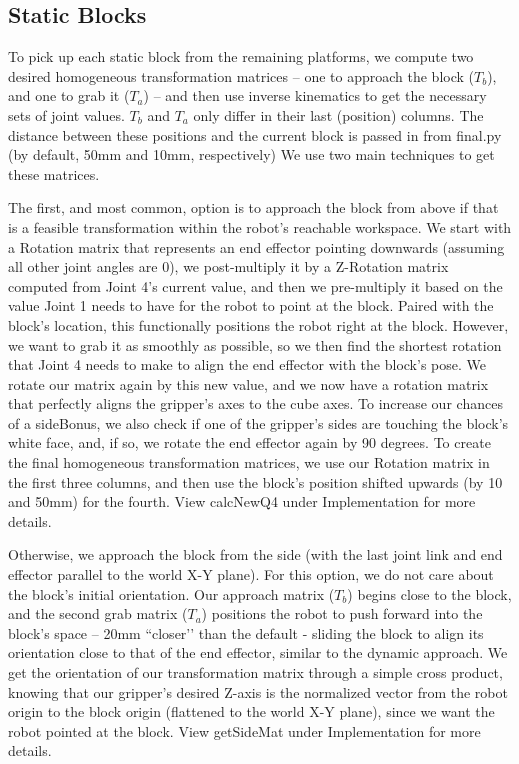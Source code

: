 \documentclass{article}
\begin{document}
    \subsection{Static Blocks}
    To pick up each static block from the remaining platforms, we compute two desired homogeneous transformation matrices – one to approach the block ($T_b$), and one to grab it ($T_a$) – and then use inverse kinematics to get the necessary sets of joint values. $T_b$ and $T_a$ only differ in their last (position) columns. The distance between these positions and the current block is passed in from final.py (by default, 50mm and 10mm, respectively) We use two main techniques to get these matrices. 
    
    The first, and most common, option is to approach the block from above if that is a feasible transformation within the robot’s reachable workspace. We start with a Rotation matrix that represents an end effector pointing downwards (assuming all other joint angles are 0), we post-multiply it by a Z-Rotation matrix computed from Joint 4’s current value, and then we pre-multiply it based on the value Joint 1 needs to have for the robot to point at the block. Paired with the block’s location, this functionally positions the robot right at the block. However, we want to grab it as smoothly as possible, so we then find the shortest rotation that Joint 4 needs to make to align the end effector with the block’s pose. We rotate our matrix again by this new value, and we now have a rotation matrix that perfectly aligns the gripper’s axes to the cube axes. To increase our chances of a sideBonus, we also check if one of the gripper’s sides are touching the block’s white face, and, if so, we rotate the end effector again by 90 degrees. To create the final homogeneous transformation matrices, we use our Rotation matrix in the first three columns, and then use the block’s position shifted upwards (by 10 and 50mm) for the fourth. View calcNewQ4 under Implementation for more details.
    
    Otherwise, we approach the block from the side (with the last joint link and end effector parallel to the world X-Y plane). For this option, we do not care about the block’s initial orientation. Our approach matrix ($T_b$) begins close to the block, and the second grab matrix ($T_a$) positions the robot to push forward into the block’s space – 20mm ``closer’’ than the default - sliding the block to align its orientation close to that of the end effector, similar to the dynamic approach. We get the orientation of our transformation matrix through a simple cross product, knowing that our gripper’s desired Z-axis is the normalized vector from the robot origin to the block origin (flattened to the world X-Y plane), since we want the robot pointed at the block. View getSideMat under Implementation for more details.
    
\end{document}
